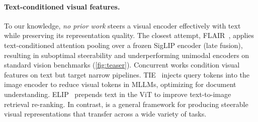 

\paragraph{Text-conditioned visual features.}

To our knowledge, \textit{no prior work} steers a visual encoder effectively with text while preserving its representation quality.
The closest attempt, FLAIR~\cite{xiao2025flair}, applies text-conditioned attention pooling over a frozen SigLIP encoder (late fusion), resulting in suboptimal steerability and underperforming unimodal encoders on standard vision benchmarks (\cref{fig:teaser}).
Concurrent works condition visual features on text but target narrow pipelines.
TIE~\cite{thirukovalluru2025tie} injects query tokens into the image encoder to reduce visual tokens in MLLMs, optimizing for document understanding.
ELIP~\cite{zhan2025elip} prepends text in the ViT to improve text-to-image retrieval re-ranking.
In contrast, \model{} is a general framework for producing steerable visual representations that transfer across a wide variety of tasks.

